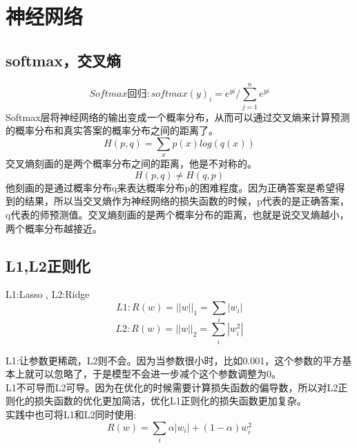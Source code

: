 \documentclass[16pt,UTF8]{ctexart}
\begin{document}
\LARGE
\section{神经网络}
\subsection{softmax，交叉熵}
	\begin{displaymath}
	Softmax\textrm{回归}:softmax(y)_{i} = e^{yi}/\sum_{j=1}^n e^{yi}	
	\end{displaymath}
	Softmax层将神经网络的输出变成一个概率分布，从而可以通过交叉熵来计算预测的概率分布和真实答案的概率分布之间的距离了。\\
	\begin{displaymath}
	H(p,q) = \sum_{x} p(x)log(q(x)) 
	\end{displaymath}
	交叉熵刻画的是两个概率分布之间的距离，他是不对称的。
	\begin{displaymath}
  	H(p,q) \neq H(q,p)
	\end{displaymath}
	他刻画的是通过概率分布q来表达概率分布p的困难程度。因为正确答案是希望得到的结果，所以当交叉熵作为神经网络的损失函数的时候，p代表的是正确答案，q代表的师预测值。交叉熵刻画的是两个概率分布的距离，也就是说交叉熵越小，两个概率分布越接近。
	
\subsection{L1,L2正则化}
	\indent L1:Lasso , L2:Ridge \\		

	\begin{displaymath}
	L1:R(w) = ||w||_{1} = \sum_{i}|w_{i}|
	\end{displaymath}
	\begin{displaymath}
	L2:R(w) = ||w||_{2} = \sum_{i}|w_{i}^{2}|
	\end{displaymath}
	
	\indent L1:让参数更稀疏，L2则不会。因为当参数很小时，比如0.001，这个参数的平方基本上就可以忽略了，于是模型不会进一步减个这个参数调整为0。\\
	\indent L1不可导而L2可导。因为在优化的时候需要计算损失函数的偏导数，所以对L2正则化的损失函数的优化更加简洁，优化L1正则化的损失函数更加复杂。\\
	\indent 实践中也可将L1和L2同时使用:
	\begin{displaymath}
		R(w) = \sum_{i}\alpha|w_{i}| + (1 - \alpha)w_{i}^{2}
	\end{displaymath}
	
\end{document}
